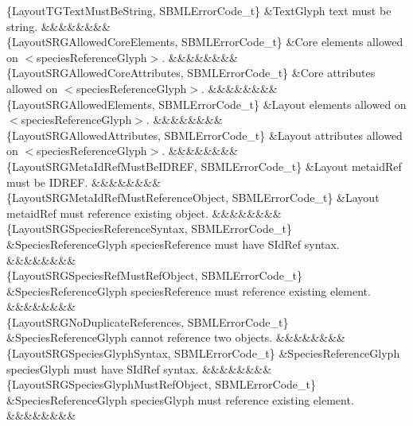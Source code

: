 \begin{DoxyParagraph}{}
\begin{longtabu}
\{Layout\+T\+G\+Text\+Must\+Be\+String, S\+B\+M\+L\+Error\+Code\+\_\+t\} &Text\+Glyph \textquotesingle{}text\textquotesingle{} must be string. &&&&&&&&\\
\{Layout\+S\+R\+G\+Allowed\+Core\+Elements, S\+B\+M\+L\+Error\+Code\+\_\+t\} &Core elements allowed on {\ttfamily $<$species\+Reference\+Glyph$>$}. &&&&&&&&\\
\{Layout\+S\+R\+G\+Allowed\+Core\+Attributes, S\+B\+M\+L\+Error\+Code\+\_\+t\} &Core attributes allowed on {\ttfamily $<$species\+Reference\+Glyph$>$}. &&&&&&&&\\
\{Layout\+S\+R\+G\+Allowed\+Elements, S\+B\+M\+L\+Error\+Code\+\_\+t\} &Layout elements allowed on {\ttfamily $<$species\+Reference\+Glyph$>$}. &&&&&&&&\\
\{Layout\+S\+R\+G\+Allowed\+Attributes, S\+B\+M\+L\+Error\+Code\+\_\+t\} &Layout attributes allowed on {\ttfamily $<$species\+Reference\+Glyph$>$}. &&&&&&&&\\
\{Layout\+S\+R\+G\+Meta\+Id\+Ref\+Must\+Be\+I\+D\+R\+EF, S\+B\+M\+L\+Error\+Code\+\_\+t\} &Layout \textquotesingle{}metaid\+Ref\textquotesingle{} must be I\+D\+R\+EF. &&&&&&&&\\
\{Layout\+S\+R\+G\+Meta\+Id\+Ref\+Must\+Reference\+Object, S\+B\+M\+L\+Error\+Code\+\_\+t\} &Layout \textquotesingle{}metaid\+Ref\textquotesingle{} must reference existing object. &&&&&&&&\\
\{Layout\+S\+R\+G\+Species\+Reference\+Syntax, S\+B\+M\+L\+Error\+Code\+\_\+t\} &Species\+Reference\+Glyph \textquotesingle{}species\+Reference\textquotesingle{} must have S\+Id\+Ref syntax. &&&&&&&&\\
\{Layout\+S\+R\+G\+Species\+Ref\+Must\+Ref\+Object, S\+B\+M\+L\+Error\+Code\+\_\+t\} &Species\+Reference\+Glyph \textquotesingle{}species\+Reference\textquotesingle{} must reference existing element. &&&&&&&&\\
\{Layout\+S\+R\+G\+No\+Duplicate\+References, S\+B\+M\+L\+Error\+Code\+\_\+t\} &Species\+Reference\+Glyph cannot reference two objects. &&&&&&&&\\
\{Layout\+S\+R\+G\+Species\+Glyph\+Syntax, S\+B\+M\+L\+Error\+Code\+\_\+t\} &Species\+Reference\+Glyph \textquotesingle{}species\+Glyph\textquotesingle{} must have S\+Id\+Ref syntax. &&&&&&&&\\
\{Layout\+S\+R\+G\+Species\+Glyph\+Must\+Ref\+Object, S\+B\+M\+L\+Error\+Code\+\_\+t\} &Species\+Reference\+Glyph \textquotesingle{}species\+Glyph\textquotesingle{} must reference existing element. &&&&&&&&\\

\end{longtabu}
\end{DoxyParagraph}
